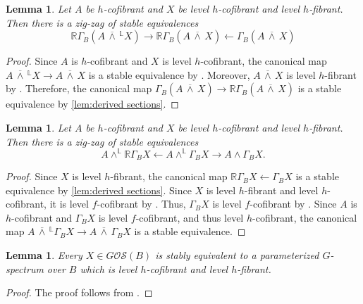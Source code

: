 \documentclass[11pt]{amsart}
\newcommand{\R}{\mathbb R}
\newcommand{\barsmash}{\,\overline\wedge\,}
\newcommand{\Osp}{\mathcal{OS}}
\theoremstyle{plain}   %
\newtheorem{lem}[thm]{Lemma}
\theoremstyle{definition}
\theoremstyle{remark}
\numberwithin{equation}{section}
\begin{document}
\begin{lem}\label{lem:derived1}
Let $A$ be $h$-cofibrant and $X$ be level $h$-cofibrant and level $h$-fibrant. Then there is a zig-zag of stable equivalences 
\[
\R\Gamma_B(A\barsmash^{\mathbb{L}} X) \rightarrow \R\Gamma_B(A\barsmash X)\leftarrow \Gamma_B (A\barsmash X)
\]
\end{lem}

\begin{proof}
Since $A$ is $h$-cofibrant and $X$ is level $h$-cofibrant, the canonical map $A\barsmash^{\mathbb{L}}X \to A\barsmash X$ is a stable equivalence by \cite[Lemma 5.1.4]{malkiewich_convenient}. Moreover, $A\barsmash X$ is level $h$-fibrant by \cite[Theorem 4.4.7]{malkiewich_convenient}. Therefore, the canonical map $\Gamma_B(A\barsmash X)\to \R\Gamma_B(A\barsmash X)$ is a stable equivalence by \cref{lem:derived sections}.
\end{proof}

\begin{lem}\label{lem:derived2}
Let $A$ be $h$-cofibrant and $X$ be level $h$-cofibrant and level $h$-fibrant. Then there is a zig-zag of stable equivalences
\[
A\wedge^{\mathbb{L}} \R\Gamma_B X \leftarrow A\wedge^{\mathbb{L}}\Gamma_B X\rightarrow A\wedge \Gamma_B X. 
\]
\end{lem}

\begin{proof}
Since $X$ is level $h$-fibrant, the canonical map $\R\Gamma_B X\leftarrow \Gamma_B X$ is a stable equivalence by \cref{lem:derived sections}. Since $X$ is level $h$-fibrant and level $h$-cofibrant, it is level $f$-cofibrant by \cite{heath_kamps}. Thus, $\Gamma_B X$ is level $f$-cofibrant by \cite[Proposition 2.4.6]{malkiewich_convenient}. Since $A$ is $h$-cofibrant and $\Gamma_B X$ is level $f$-cofibrant, and thus level $h$-cofibrant, the canonical map $A\barsmash^{\mathbb{L}}\Gamma_B X\rightarrow A\barsmash \Gamma_B X$ is a stable equivalence. 
\end{proof}

\begin{lem}\label{lem:level replacement}
Every $X\in G\Osp(B)$ is stably equivalent to a parameterized $G$-spectrum over $B$ which is level $h$-cofibrant and level $h$-fibrant. 
\end{lem}

\begin{proof}
The proof follows from \cite[Proposition 4.2.5]{malkiewich_convenient}.
\end{proof}
\end{document}
